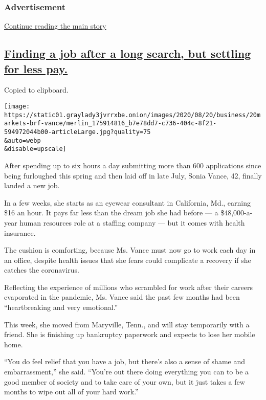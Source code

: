 \hypertarget{advertisement-1}{%
\subsubsection{Advertisement}\label{advertisement-1}}

\protect\hyperlink{after-dfp-ad-mid2}{Continue reading the main story}

\hypertarget{finding-a-job-after-a-long-search-but-settling-for-less-pay}{%
\subsection{\texorpdfstring{\protect\hyperlink{finding-a-job-after-a-long-search-but-settling-for-less-pay}{Finding
a job after a long search, but settling for less
pay.}}{Finding a job after a long search, but settling for less pay.}}\label{finding-a-job-after-a-long-search-but-settling-for-less-pay}}

Copied to clipboard.

\texttt{[image: https://static01.graylady3jvrrxbe.onion/images/2020/08/20/business/20markets-brf-vance/merlin\_175914816\_b7e78dd7-c736-404c-8f21-594972044b00-articleLarge.jpg?quality=75\\\&auto=webp\\\&disable=upscale]}

After spending up to six hours a day submitting more than 600
applications since being furloughed this spring and then laid off in
late July, Sonia Vance, 42, finally landed a new job.

In a few weeks, she starts as an eyewear consultant in California, Md.,
earning \$16 an hour. It pays far less than the dream job she had before
--- a \$48,000-a-year human resources role at a staffing company --- but
it comes with health insurance.

The cushion is comforting, because Ms. Vance must now go to work each
day in an office, despite health issues that she fears could complicate
a recovery if she catches the coronavirus.

Reflecting the experience of millions who scrambled for work after their
careers evaporated in the pandemic, Ms. Vance said the past few months
had been ``heartbreaking and very emotional.''

This week, she moved from Maryville, Tenn., and will stay temporarily
with a friend. She is finishing up bankruptcy paperwork and expects to
lose her mobile home.

``You do feel relief that you have a job, but there's also a sense of
shame and embarrassment,'' she said. ``You're out there doing everything
you can to be a good member of society and to take care of your own, but
it just takes a few months to wipe out all of your hard work.''

